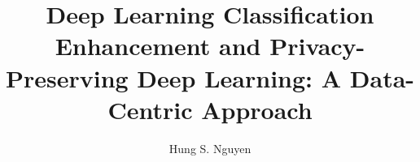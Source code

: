 \documentclass[12pt,frontmatter,copyright,dissertation]{usfmanus}
\title{
		Deep Learning Classification Enhancement and Privacy-Preserving Deep Learning: A Data-Centric Approach
}
\author{Hung S. Nguyen}
\makeatletter
\def\printvita{%
  \newpage
  \pagestyle{empty}

  \addtocontents{toc}{\protect\contentsline{chapter}%
{About the Author}{End Page}}
  \begin{center}
  ~\\~\\~\\{\bf About the Author} 
  \end{center}
  \begin{doublespace}
   \@vita\nopagebreak\par
  \end{doublespace}
  \vfill
}
\makeatother
\begin{document}
	

	





\begin{spacing}{1}


\end{spacing}


\begin{appendices}

\end{appendices}


\end{document}
